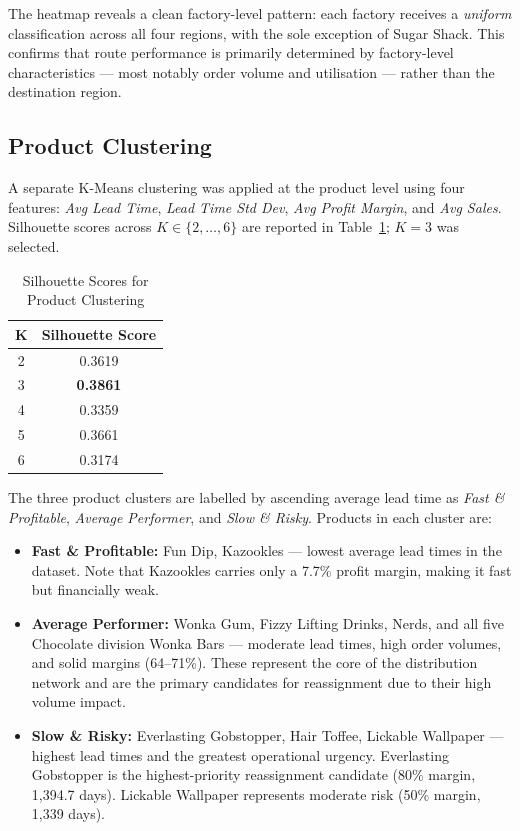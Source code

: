 \documentclass[12pt, a4paper]{article}
\begin{document}
The heatmap reveals a clean factory-level pattern: each
factory receives a \emph{uniform} classification across
all four regions, with the sole exception of Sugar Shack.
This confirms that route performance is primarily determined
by factory-level characteristics --- most notably order volume
and utilisation --- rather than the destination region.

\subsection{Product Clustering}

A separate K-Means clustering \citep{macqueen1967} was applied
at the product level using four features: \textit{Avg Lead Time},
\textit{Lead Time Std Dev}, \textit{Avg Profit Margin},
and \textit{Avg Sales}. Silhouette scores across
$K \in \{2, \ldots, 6\}$ are reported in
Table~\ref{tab:prod_silhouette}; $K = 3$ was selected.

\begin{table}[H]
\centering
\caption{Silhouette Scores for Product Clustering}
\label{tab:prod_silhouette}
\renewcommand{\arraystretch}{1.12}
\begin{tabular}{cc}
\toprule
\textbf{K} & \textbf{Silhouette Score} \\
\midrule
2 & 0.3619 \\
\rowcolor{lightgray}
3 & \textbf{0.3861} \\
4 & 0.3359 \\
5 & 0.3661 \\
6 & 0.3174 \\
\bottomrule
\end{tabular}
\end{table}

The three product clusters are labelled by ascending average
lead time as \emph{Fast \& Profitable},
\emph{Average Performer}, and \emph{Slow \& Risky}.
Products in each cluster are:

\begin{itemize}[leftmargin=*]
    \item \textbf{Fast \& Profitable:} Fun Dip, Kazookles
          --- lowest average lead times in the dataset.
          Note that Kazookles carries only a 7.7\% profit
          margin, making it fast but financially weak.
    \item \textbf{Average Performer:} Wonka Gum, Fizzy
          Lifting Drinks, Nerds, and all five Chocolate
          division Wonka Bars --- moderate lead times,
          high order volumes, and solid margins
          (64--71\%). These represent the core of the
          distribution network and are the primary
          candidates for reassignment due to their
          high volume impact.
    \item \textbf{Slow \& Risky:} Everlasting Gobstopper,
          Hair Toffee, Lickable Wallpaper --- highest lead
          times and the greatest operational urgency.
          Everlasting Gobstopper is the highest-priority
          reassignment candidate (80\% margin, 1,394.7
          days). Lickable Wallpaper represents moderate
          risk (50\% margin, 1,339 days).
\end{itemize}
\end{document}
